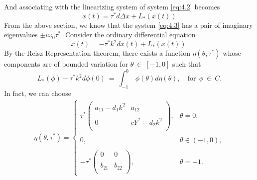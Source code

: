 \documentclass[10pt]{amsart}
\theoremstyle{definition}
\begin{document}
And associating with the linearizing system of system \eqref{eq:4.2} becomes
\begin{equation}\label{eq:4.3}
{\dot x}(t)=\tau^* d \Delta x + L_*(x(t))
\end{equation}
From the above section, we know that the system \eqref{eq:4.3} has a pair of imaginary eigenvalues $\pm i\omega_0\tau^*$. Consider the ordinary differential equation
\begin{equation}\label{eq:4.4}
{\dot x}(t)=-\tau^*k^2dx(t)+L_*(x(t)).
\end{equation}
By the Reisz Representation theorem, there exists a function $\eta(\theta,\tau^*)$ whose components are of bounded variation for $\theta~\in~[-1,0]$
such that
\begin{equation}\label{eq:4.5}
L_{*}(\phi)-\tau^*k^2d\phi (0)~=~
\int_{-1}^{0}~\phi(\theta)d\eta(\theta),\quad\mbox{for} ~~\phi ~\in~ C.
\end{equation}
In fact, we can choose\\
\begin{align}\label{eq:4.6}
\eta(\theta,\tau^*) =\left\{\begin{array}{lll}\tau^*\left(
      \begin{array}{cc}
      {\displaystyle{a_{11}-d_1k^2}} & {\displaystyle{a_{12}}} \\ \\
      {\displaystyle{0}} & {\displaystyle{cY^*-d_2k^2}} \\
    \end{array}
    \right),& \theta=0,\\
\\ 0,&  \theta \in (-1,0), \\
\\ -\tau^*\left(
       \begin{array}{cc}
       {\displaystyle{0}} & {\displaystyle{0}}\\ \\
     {\displaystyle{b_{21}}} & {\displaystyle{b_{22}}}\\
    \end{array}
    \right),& \theta=-1.\end{array}\right.
    \end{align}
\end{document}
